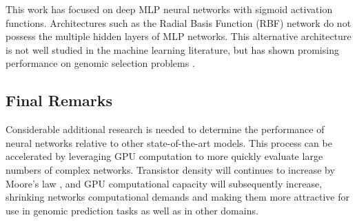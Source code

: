 This work has focused on deep MLP neural networks with sigmoid activation functions.
Architectures such as the Radial Basis Function (RBF) network do not possess the multiple hidden
layers of MLP networks. This alternative architecture is not well studied in the machine learning 
literature, but has shown promising performance on genomic selection 
problems \citep{gonzalez-camacho2012}.

\subsection*{Final Remarks}

Considerable additional research is needed to determine the performance of 
neural networks relative to other state-of-the-art models. This process can
be accelerated by leveraging GPU computation to more quickly evaluate
large numbers of complex networks. Transistor density will continues to
increase by Moore's law \citep{moore1965}, and GPU computational capacity will subsequently
increase, shrinking networks computational demands and making them more
attractive for use in genomic prediction tasks as well as in other domains.

